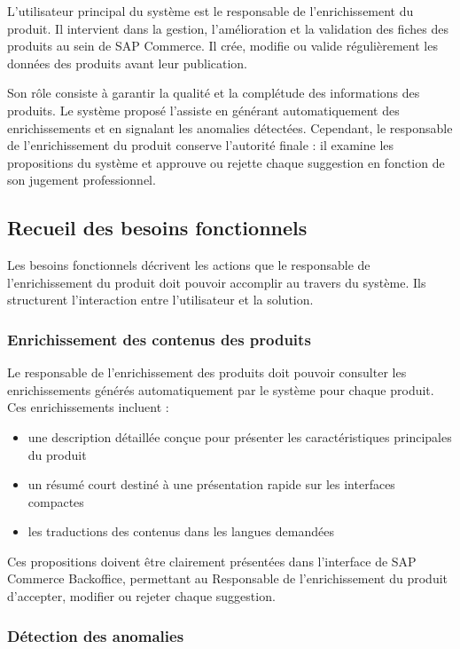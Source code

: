 L'utilisateur principal du système est le responsable de l'enrichissement du produit. Il intervient dans la gestion, l'amélioration et la validation des fiches des produits au sein de SAP Commerce. Il crée, modifie ou valide régulièrement les données des produits avant leur publication. 

Son rôle consiste à garantir la qualité et la complétude des informations des produits. Le système proposé l'assiste en générant automatiquement des enrichissements et en signalant les anomalies détectées. Cependant, le responsable de l'enrichissement du produit conserve l'autorité finale : il examine les propositions du système et approuve ou rejette chaque suggestion en fonction de son jugement professionnel.

\subsection{Recueil des besoins fonctionnels}

Les besoins fonctionnels décrivent les actions que le responsable de l'enrichissement du produit doit pouvoir accomplir au travers du système. Ils structurent l'interaction entre l'utilisateur et la solution.

\subsubsection{Enrichissement des contenus des produits}

Le responsable de l'enrichissement des produits doit pouvoir consulter les enrichissements générés automatiquement par le système pour chaque produit. Ces enrichissements incluent :

\begin{itemize}
    \item une description détaillée conçue pour présenter les caractéristiques principales du produit 
    \item un résumé court destiné à une présentation rapide sur les interfaces compactes 
    \item les traductions des contenus dans les langues demandées
\end{itemize}

Ces propositions doivent être clairement présentées dans l'interface de SAP Commerce Backoffice, permettant au Responsable de l'enrichissement du produit d'accepter, modifier ou rejeter chaque suggestion.

\subsubsection{Détection des anomalies}

